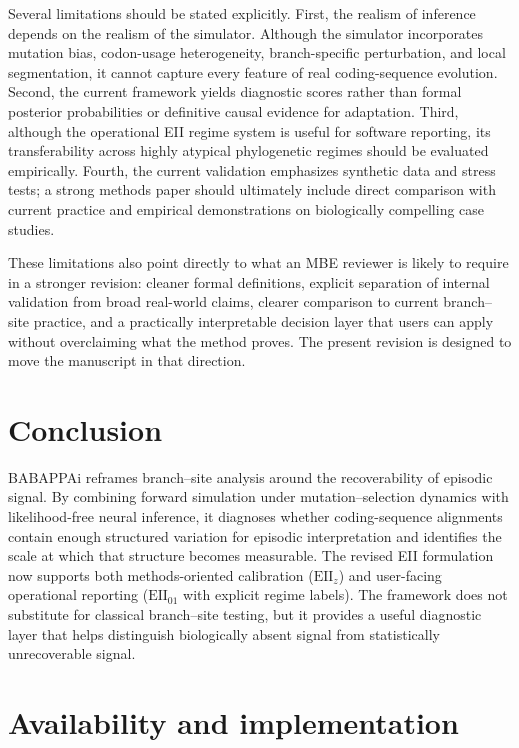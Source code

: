 \documentclass[11pt]{article}
\begin{document}
Several limitations should be stated explicitly. First, the realism of inference depends on the realism of the simulator. Although the simulator incorporates mutation bias, codon-usage heterogeneity, branch-specific perturbation, and local segmentation, it cannot capture every feature of real coding-sequence evolution. Second, the current framework yields diagnostic scores rather than formal posterior probabilities or definitive causal evidence for adaptation. Third, although the operational EII regime system is useful for software reporting, its transferability across highly atypical phylogenetic regimes should be evaluated empirically. Fourth, the current validation emphasizes synthetic data and stress tests; a strong methods paper should ultimately include direct comparison with current practice and empirical demonstrations on biologically compelling case studies.

These limitations also point directly to what an MBE reviewer is likely to require in a stronger revision: cleaner formal definitions, explicit separation of internal validation from broad real-world claims, clearer comparison to current branch--site practice, and a practically interpretable decision layer that users can apply without overclaiming what the method proves. The present revision is designed to move the manuscript in that direction.

\section{Conclusion}

BABAPPAi reframes branch--site analysis around the recoverability of episodic signal. By combining forward simulation under mutation--selection dynamics with likelihood-free neural inference, it diagnoses whether coding-sequence alignments contain enough structured variation for episodic interpretation and identifies the scale at which that structure becomes measurable. The revised EII formulation now supports both methods-oriented calibration ($\mathrm{EII}_{z}$) and user-facing operational reporting ($\mathrm{EII}_{01}$ with explicit regime labels). The framework does not substitute for classical branch--site testing, but it provides a useful diagnostic layer that helps distinguish biologically absent signal from statistically unrecoverable signal.

\section*{Availability and implementation}
\end{document}
